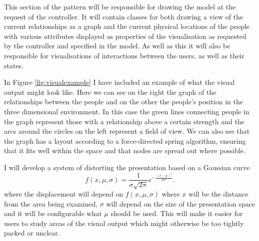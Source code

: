 \documentclass[12pt,a4paper]{article}
\begin{document}
This section of the pattern will be responsible for drawing the model at the request of the controller. It will contain classes for both drawing a view of the current relationships as a graph and the current physical locations of the people with various attributes displayed as properties of the visualisation as requested by the controller and specified in the model. As well as this it will also be responsible for visualisations of interactions between the users, as well as their states.

In Figure \ref{fig:visualexample} I have included an example of what the visual output might look like. Here we can see on the right the graph of the relationships between the people and on the other the people's position in the three dimensional environment. In this case the green lines connecting people in the graph represent those with a relationship above a certain strength and the arcs around the circles on the left represent a field of view. We can also see that the graph has a layout according to a force-directed spring algorithm, ensuring that it fits well within the space and that nodes are spread out where possible.

I will develop a system of distorting the presentation based on a Gaussian curve
\begin{equation}
f(x,\mu,\sigma)=\frac{1}{\sigma\sqrt{2\pi}}e^{-\frac{(x-\mu)^2}{2\sigma^2}}.
\end{equation}
where the displacement will depend on $f(x,\mu,\sigma)$ where $x$ will be the distance from the area being examined, $\sigma$ will depend on the size of the presentation space and it will be configurable what $\mu$ should be used. This will make it easier for users to study areas of the visual output which might otherwise be too tightly packed or unclear.
\end{document}
